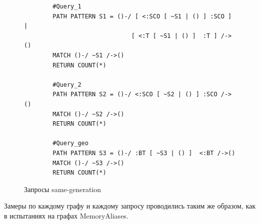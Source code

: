 \documentclass[14pt]{matmex-diploma-custom}
\begin{document}
\begin{figure}[h!]
    \begin{verbatim}
        #Query_1
        PATH PATTERN S1 = ()-/ [ <:SCO [ ~S1 | () ] :SCO ] |
                              [ <:T [ ~S1 | () ]  :T ] /->()
        MATCH ()-/ ~S1 /->()
        RETURN COUNT(*)
        
        #Query_2
        PATH PATTERN S2 = ()-/ <:SCO [ ~S2 | () ] :SCO /->()
        MATCH ()-/ ~S2 /->()
        RETURN COUNT(*)
        
        #Query_geo
        PATH PATTERN S3 = ()-/ :BT [ ~S3 | () ]  <:BT /->()
        MATCH ()-/ ~S3 /->()
        RETURN COUNT(*)
    \end{verbatim}
    \caption{Запросы same-generation}
    \label{rdf_q}
\end{figure}

Замеры по каждому графу и каждому запросу проводились таким же образом, как в испытаниях на графах MemoryAliases.\\
\begin{table}[h!]
    \centering
    \caption{Результаты экспериментов с контекстно-свободными запросами к RDF-данным}
    \label{tab:rdf_res}
\end{table}
\end{document}
